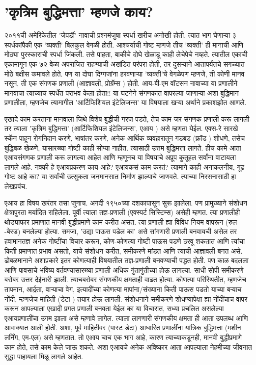 \chapter{'कृत्रिम बुद्धिमत्ता' म्हणजे काय?}

२०११ची अमेरिकेतील 'जेपर्डी' नावाची प्रश्नमंजुषा स्पर्धा खरीच अनोखी होती. त्यात भाग घेणाऱ्या ३ स्पर्धकांपैकी एक 'व्यक्ती' बिलकुल वेगळी होती. आश्चर्याची गोष्ट म्हणजे तीच 'व्यक्ती' ही मानाची आणि मोठ्या पुरस्काराची स्पर्धा जिंकली. तसे पाहता, बाकीचे दोघे खेळाडू काही लेचेपेचे नव्हते. त्यातील एकाची एकामागून एक ७२ वेळा अपराजित राहण्याची अखंडित परंपरा होती, तर दुसऱ्याने आतापर्यंतचे सगळ्यात मोठे बक्षीस कमावले होते. पण या दोघा दिग्गजांना हरवणाऱ्या 'व्यक्ती'चे वेगळेपण म्हणजे, ती कोणी मानव नसून, ती एक संगणक प्रणाली (आज्ञावली, प्रोग्रॅम्स ) होती. आय-बी-एम वॉटसन   नावाच्या या प्रणालीने मानवाचा त्याच्याच स्पर्धेत पराभव केला होता!! या घटनेने संगणकात वापरल्या जाणाऱ्या अशा बुद्धिमान प्रणालीला, म्हणजेच त्यामागील 'आर्टिफिशियल इंटेलिजन्स' या विषयाला खऱ्या अर्थाने प्रकाशझोत आणले.

एखादे काम करताना मानवाला जिथे विशेष बुद्धीची गरज पडते, तेच काम जर संगणक प्रणाली करू लागली तर त्याला 'कृत्रिम बुद्धिमत्ता' (आर्टिफिशियल इंटेलिजन्स', एआय ) असे म्हणता येईल. एक्स-रे सारखे स्कॅन पाहून रोगनिदान करणे, भाषांतर करणे, अनेक आर्थिक व्यवहारातून गडबड (फ्रॉड ) शोधणे, तसेच बुद्धिबळ खेळणे, यासारख्या गोष्टी काही सोप्या नाहीत. त्यासाठी उत्तम बुद्धिमत्ता लागते. हीच कामे आता एआयसंगणक प्रणाली करू लागल्या आहेत आणि म्हणूनच या विषयाचे अप्रूप कुतूहल सर्वांना वाटायला लागले आहे. नक्की हे एआयप्रकरण काय आहे? एआयकसं काम करतं? त्यामागे काही अनाकलनीय, गूढ गोष्ट आहे का? या सर्वांची उत्सुकता जनमानसात निर्माण झाल्याचे जाणवते. त्याच्या निरसनासाठी हा लेखप्रपंच.

एआय हा विषय खरंतर तसा जुनाच. अगदी १९५०च्या दशकापासून सुरू झालेला. पण प्रामुख्याने संशोधन क्षेत्रापुरता मर्यादित राहिलेला. पूर्वी त्याला तज्ञ-प्रणाली (एक्स्पर्ट सिस्टिम्स) असेही म्हणत. त्या प्रणालीही थोड्याफार प्रमाणात मानवी बुद्धीप्रमाणे काम करीत असत. त्या प्रणाली ह्या विविध नियम वापरून (रुल -बेस्ड) बनलेल्या होत्या. समजा, 'उद्या पाऊस पडेल का' असे सांगणारी प्रणाली बनवायची असेल तर हवामानतज्ञ अनेक गोष्टींचा विचार करून, कोण-कोणत्या गोष्टी पाऊस पडणे ठरवू शकतात आणि त्यांचा किती प्रमाणात प्रभाव असतो, याचे संशोधन करीत, समीकरणे मांडत आणि त्याची आज्ञावली बनत असे. ढोबळमानाने अशाप्रकारे इतर कोणत्याही विषयातील तज्ञ-प्रणाली बनवण्याची पद्धत होती. पण काळ बदलला आणि पावसाचे भविष्य वर्तवण्यासारख्या प्रणाली अधिक गुंतागुंतीच्या होऊ लागल्या. साधी सोपी समीकरणे बरोबर उत्तर देईनारी झाली. त्याचबरोबर संगणकीय क्षमताही वाढत होत्या. कोणत्या परिस्थितीत, म्हणजेच तापमान, आर्द्रता, वाऱ्याचा वेग, इत्यादींच्या कोणत्या मापांना/संख्याना किती पाऊस पडतो याच्या बऱ्याच नोंदी, म्हणजेच माहिती (डेटा ) तयार होऊ लागली. संशोधनाने समीकरणे शोधण्यापेक्षा ह्या नोंदींचाच वापर करून आपल्याला एखादी प्रगत प्रणाली बनवता येईल का या विचारात, सध्या प्रचलित असलेल्या एआयप्रणालींचा उगम झाला असे म्हणावे लागेल. त्याला लागणारी संगणकीय क्षमता ही आता उपलब्ध आणि आवाक्यात आली होती. अशा, पूर्व माहितीवर (पास्ट डेटा) आधारित प्रणालींना यांत्रिक बुद्धिमत्ता (मशीन लर्निंग, एम-एल) असे म्हणतात. तो एआय चाच एक भाग आहे, कारण त्याच्याकडूनही, मानवी बुद्धीप्रमाणे काम होते, तसे काम केले जाऊ शकते. अशा एआयचे अनेक अविष्कार आता आपल्याला नेहमीच्या जीवनात सुद्धा पाहायला मिळू लागले आहेत.

